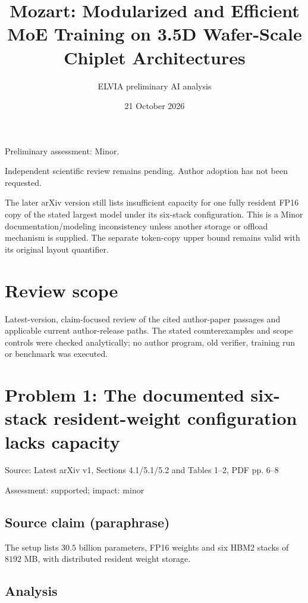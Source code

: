 \documentclass[11pt]{article}
\begin{document}
\title{Mozart: Modularized and Efficient MoE Training on 3.5D Wafer-Scale Chiplet Architectures}

\author{ELVIA preliminary AI analysis}\date{21 October 2026}\maketitle

Preliminary assessment: Minor.\par

Independent scientific review remains pending. Author adoption has not been requested.

The later arXiv version still lists insufficient capacity for one fully resident FP16 copy of the stated largest model under its six-stack configuration. This is a Minor documentation/modeling inconsistency unless another storage or offload mechanism is supplied. The separate token-copy upper bound remains valid with its original layout quantifier.

\section*{Review scope}

Latest-version, claim-focused review of the cited author-paper passages and applicable current author-release paths. The stated counterexamples and scope controls were checked analytically; no author program, old verifier, training run or benchmark was executed.

\section*{Problem 1: The documented six-stack resident-weight configuration lacks capacity}

Source: Latest arXiv v1, Sections 4.1/5.1/5.2 and Tables 1–2, PDF pp. 6–8

Assessment: supported; impact: minor

\subsection*{Source claim (paraphrase)}

The setup lists \(30.5\) billion parameters, FP16 weights and six HBM2 stacks of \(8192\) MB, with distributed resident weight storage.

\subsection*{Analysis}
\end{document}

